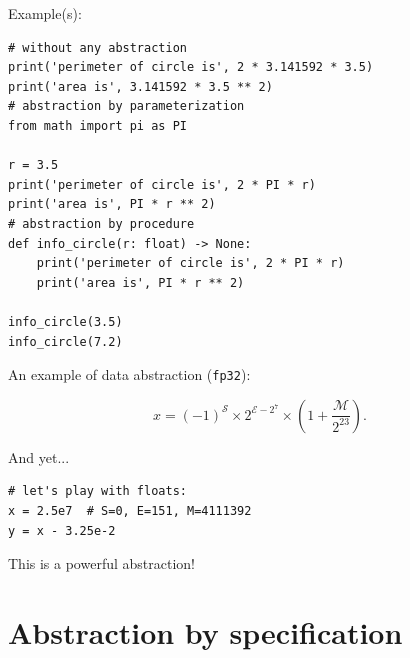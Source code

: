 \documentclass[10pt,
aspectratio=169
]{beamer}
\begin{document}
\begin{frame}[fragile]
	Example(s):
	\begin{verbatim}
# without any abstraction
print('perimeter of circle is', 2 * 3.141592 * 3.5)
print('area is', 3.141592 * 3.5 ** 2)
# abstraction by parameterization
from math import pi as PI

r = 3.5
print('perimeter of circle is', 2 * PI * r)
print('area is', PI * r ** 2)
# abstraction by procedure
def info_circle(r: float) -> None:
	print('perimeter of circle is', 2 * PI * r)
	print('area is', PI * r ** 2)

info_circle(3.5)
info_circle(7.2)
\end{verbatim}
\end{frame}


\begin{frame}[fragile]
	An example of data abstraction (\texttt{fp32}):
	\begin{center}
		\begin{equation*}
			x = (-1)^\mathcal{S} \times 2^{\mathcal{E}-2^7} \times \left(1+\frac{\mathcal M}{2^{23}}\right).
		\end{equation*}
	\end{center}
	And yet...
	\begin{verbatim}
# let's play with floats:
x = 2.5e7  # S=0, E=151, M=4111392
y = x - 3.25e-2
	\end{verbatim}
	This is a powerful abstraction!
\end{frame}

\section{Abstraction by specification}
\end{document}
